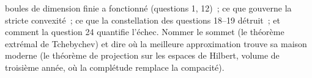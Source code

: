 \begin{problem}
\begin{enumerate}[resume]
        boules de dimension finie a fonctionné (questions 1, 12)~; ce
        que gouverne la stricte convexité~; ce que la constellation
        des questions 18--19 détruit~; et comment la question 24
        quantifie l'échec. Nommer le sommet (le théorème extrémal de
        Tchebychev) et dire où la meilleure approximation
        trouve sa maison moderne (le théorème de projection sur les
        espaces de Hilbert, volume de troisième année, où la complétude
        remplace la compacité).
\end{enumerate}
\end{problem}
